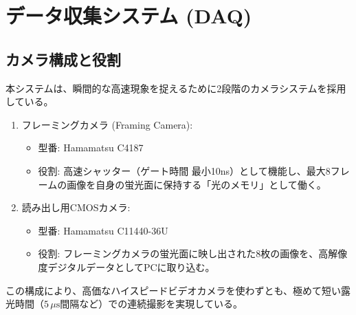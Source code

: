 \section{データ収集システム (DAQ)}

\subsection{カメラ構成と役割}
本システムは、瞬間的な高速現象を捉えるために2段階のカメラシステムを採用している。

\begin{enumerate}
    \item フレーミングカメラ (Framing Camera):
    \begin{itemize}
        \item 型番: Hamamatsu C4187
        \item 役割: 高速シャッター（ゲート時間 最小10ns）として機能し、最大8フレームの画像を自身の蛍光面に保持する「光のメモリ」として働く。
    \end{itemize}
    
    \item 読み出し用CMOSカメラ:
    \begin{itemize}
        \item 型番: Hamamatsu C11440-36U
        \item 役割: フレーミングカメラの蛍光面に映し出された8枚の画像を、高解像度デジタルデータとしてPCに取り込む。
    \end{itemize}
\end{enumerate}

この構成により、高価なハイスピードビデオカメラを使わずとも、極めて短い露光時間（$5\,\mu\mathrm{s}$間隔など）での連続撮影を実現している\cite{Xiang2021}。